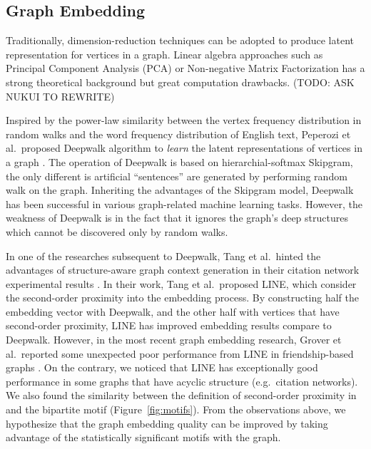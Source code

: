 \documentclass[letterpaper]{article}
\begin{document}
        \subsection{Graph Embedding}
            
            Traditionally, dimension-reduction techniques can be adopted to produce latent 
            representation for vertices in a graph. Linear algebra approaches such as Principal
            Component Analysis (PCA) \cite{pca} or Non-negative Matrix Factorization has
            a strong theoretical background but great computation drawbacks. (TODO: ASK NUKUI
            TO REWRITE)

            Inspired by the power-law similarity between the vertex frequency distribution in
            random walks and the word frequency distribution of English text, Peperozi et al.\ proposed
            Deepwalk algorithm to \emph{learn} the latent representations of vertices in a
            graph \cite{deepwalk}. The operation of Deepwalk is based on hierarchial-softmax
            Skipgram, the only different is artificial ``sentences'' are generated by performing
            random walk on the graph. Inheriting the advantages of the Skipgram model, Deepwalk
            has been successful in various graph-related machine learning tasks. However, the weakness
            of Deepwalk is in the fact that it ignores the graph's deep structures which cannot 
            be discovered only by random walks. 

            
            In one of the researches subsequent to Deepwalk, Tang et al.\ hinted the advantages 
            of structure-aware graph context generation in their citation network experimental 
            results \cite{line}. In their work, Tang et al.\ proposed LINE, which consider the
            second-order proximity into the embedding process. By constructing half the embedding
            vector with Deepwalk, and the other half with vertices that have second-order proximity,
            LINE has improved embedding results compare to Deepwalk. However, in the most recent
            graph embedding research, Grover et al.\ reported some unexpected poor performance
            from LINE in friendship-based graphs \cite{node2vec}. On the contrary, we noticed that 
            LINE has exceptionally good performance in some graphs that have acyclic structure 
            (e.g.\ citation networks). We also found the similarity between the definition of 
            second-order proximity in \cite{line} and the bipartite motif (Figure~\ref{fig:motifs}).
            From the observations above, we hypothesize that the graph embedding quality can be
            improved by taking advantage of the statistically significant motifs with the graph.
\end{document}
